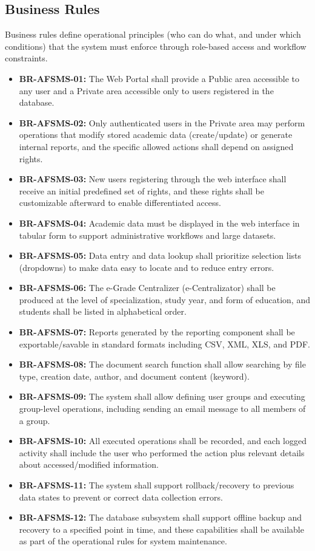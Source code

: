 \documentclass[11pt, a4paper]{article}
\begin{document}
\subsection{Business Rules}
Business rules define operational principles (who can do what, and under which conditions) that the system must enforce through role-based access and workflow constraints.
\begin{itemize}
    \item \textbf{BR-AFSMS-01:} The Web Portal shall provide a Public area accessible to any user and a Private area accessible only to users registered in the database.
    \item \textbf{BR-AFSMS-02:} Only authenticated users in the Private area may perform operations that modify stored academic data (create/update) or generate internal reports, and the specific allowed actions shall depend on assigned rights.
    \item \textbf{BR-AFSMS-03:} New users registering through the web interface shall receive an initial predefined set of rights, and these rights shall be customizable afterward to enable differentiated access.
    \item \textbf{BR-AFSMS-04:} Academic data must be displayed in the web interface in tabular form to support administrative workflows and large datasets.
    \item \textbf{BR-AFSMS-05:} Data entry and data lookup shall prioritize selection lists (dropdowns) to make data easy to locate and to reduce entry errors.
    \item \textbf{BR-AFSMS-06:} The e-Grade Centralizer (e-Centralizator) shall be produced at the level of specialization, study year, and form of education, and students shall be listed in alphabetical order.
    \item \textbf{BR-AFSMS-07:} Reports generated by the reporting component shall be exportable/savable in standard formats including CSV, XML, XLS, and PDF.
    \item \textbf{BR-AFSMS-08:} The document search function shall allow searching by file type, creation date, author, and document content (keyword).
    \item \textbf{BR-AFSMS-09:} The system shall allow defining user groups and executing group-level operations, including sending an email message to all members of a group.
    \item \textbf{BR-AFSMS-10:} All executed operations shall be recorded, and each logged activity shall include the user who performed the action plus relevant details about accessed/modified information.
    \item \textbf{BR-AFSMS-11:} The system shall support rollback/recovery to previous data states to prevent or correct data collection errors.
    \item \textbf{BR-AFSMS-12:} The database subsystem shall support offline backup and recovery to a specified point in time, and these capabilities shall be available as part of the operational rules for system maintenance.
\end{itemize}
\end{document}
